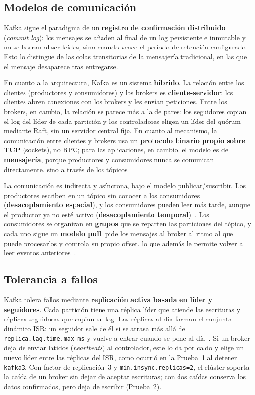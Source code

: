\documentclass[12pt,a4paper]{article}
\begin{document}
\subsection{Modelos de comunicación}
Kafka sigue el paradigma de un \textbf{registro de confirmación distribuido} (\textit{commit log}): los mensajes se añaden al final de un log persistente e inmutable y no se borran al ser leídos, sino cuando vence el período de retención configurado~\cite{Wang2015,KafkaDesign39}. Esto lo distingue de las colas transitorias de la mensajería tradicional, en las que el mensaje desaparece tras entregarse.

En cuanto a la arquitectura, Kafka es un sistema \textbf{híbrido}. La relación entre los clientes (productores y consumidores) y los brokers es \textbf{cliente-servidor}: los clientes abren conexiones con los brokers y les envían peticiones. Entre los brokers, en cambio, la relación se parece más a la de pares: los seguidores copian el log del líder de cada partición y los controladores eligen un líder del quórum mediante Raft, sin un servidor central fijo. En cuanto al mecanismo, la comunicación entre clientes y brokers usa un \textbf{protocolo binario propio sobre TCP} (sockets), no RPC; para las aplicaciones, en cambio, el modelo es de \textbf{mensajería}, porque productores y consumidores nunca se comunican directamente, sino a través de los tópicos.

La comunicación es indirecta y asíncrona, bajo el modelo publicar/suscribir. Los productores escriben en un tópico sin conocer a los consumidores (\textbf{desacoplamiento espacial}), y los consumidores pueden leer más tarde, aunque el productor ya no esté activo (\textbf{desacoplamiento temporal})~\cite{Raptis2023}. Los consumidores se organizan en \textbf{grupos} que se reparten las particiones del tópico, y cada uno sigue un \textbf{modelo pull}: pide los mensajes al broker al ritmo al que puede procesarlos y controla su propio offset, lo que además le permite volver a leer eventos anteriores~\cite{KafkaDesign39}.

\subsection{Tolerancia a fallos}
Kafka tolera fallos mediante \textbf{replicación activa basada en líder y seguidores}. Cada partición tiene una réplica líder que atiende las escrituras y réplicas seguidoras que copian su log. Las réplicas al día forman el conjunto dinámico ISR: un seguidor sale de él si se atrasa más allá de \texttt{replica.lag.time.max.ms} y vuelve a entrar cuando se pone al día~\cite{Wang2015,KafkaDesign39}. Si un broker deja de enviar latidos (\textit{heartbeats}) al controlador, este lo da por caído y elige un nuevo líder entre las réplicas del ISR, como ocurrió en la Prueba~1 al detener \texttt{kafka3}. Con factor de replicación~3 y \texttt{min.insync.replicas=2}, el clúster soporta la caída de un broker sin dejar de aceptar escrituras; con dos caídas conserva los datos confirmados, pero deja de escribir (Prueba~2).
\end{document}

